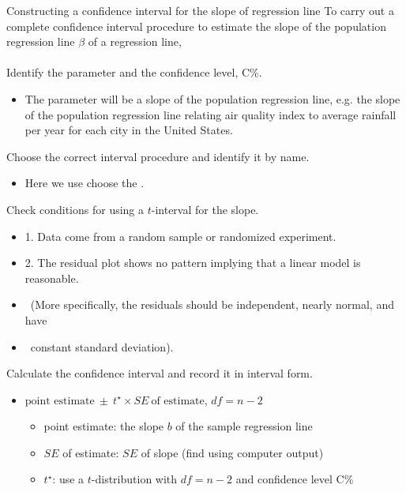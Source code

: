 \begin{onebox}{Constructing a confidence interval for the slope of regression line}
To carry out a complete confidence interval procedure to estimate the slope of the population regression line $\beta$ of a regression line,
\\
\\
 Identify the parameter and the confidence level, C\%.\vspace{-1mm}
\begin{itemize} 
\item[] The parameter will be a slope of the population regression line, e.g. the slope of the population regression line relating air quality index to average rainfall per year for each city in the United States.  
\end{itemize}
 Choose the correct interval procedure and identify it by name. \vspace{-1mm}
\begin{itemize}
\item[] Here we use choose the .
\end{itemize}
 Check conditions for using a $t$-interval for the slope.\vspace{-1mm}
\begin{itemize}
\setlength{\itemsep}{0mm}
\item[] 1.  Data come from a random sample or randomized experiment.
\item[] 2.  The residual plot shows no pattern implying that a linear model is reasonable. \item[] \quad \ (More specifically, the residuals should be independent, nearly normal, and have
\item [] \quad \  constant standard deviation).
\end{itemize}
 Calculate the confidence interval and record it in interval form.
\begin{itemize}
\item[] $\text{point estimate}\ \pm\ t^{\star} \times SE\ \text{of estimate}$, \quad $df = n - 2$
\begin{itemize}											
\item[] point estimate: the slope $b$ of the sample regression line
\item[] $SE$ of estimate: $SE$ of slope (find using computer output)
\item[] $t^{\star}$: use a $t$-distribution with $df = n-2$ and confidence level C\%

\end{itemize}
\end{itemize}
\end{onebox}
